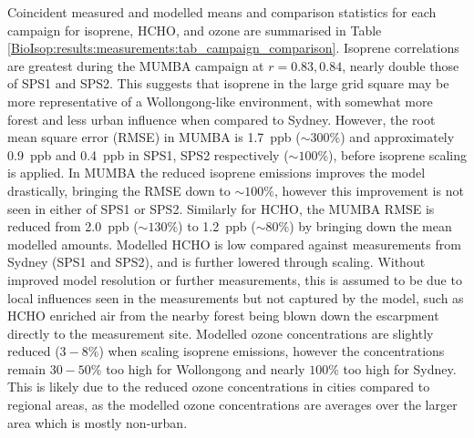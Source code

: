     Coincident measured and modelled means and comparison statistics for each campaign for isoprene, HCHO, and ozone are summarised in Table \ref{BioIsop:results:measurements:tab_campaign_comparison}.
    Isoprene correlations are greatest during the MUMBA campaign at $r=0.83,0.84$, nearly double those of SPS1 and SPS2.
    This suggests that isoprene in the large grid square may be more representative of a Wollongong-like environment, with somewhat more forest and less urban influence when compared to Sydney.
    However, the root mean square error (RMSE) in MUMBA is 1.7~ppb ($\sim 300\%$) and approximately 0.9~ppb and 0.4~ppb in SPS1, SPS2 respectively ($\sim 100\%$),  before isoprene scaling is applied.
    In MUMBA the reduced isoprene emissions improves the model drastically, bringing the RMSE down to $\sim{100}\%$, however this improvement is not seen in either of SPS1 or SPS2.
    Similarly for HCHO, the MUMBA RMSE is reduced from 2.0~ppb ($\sim{130}\%$) to 1.2~ppb ($\sim{80}\%$) by bringing down the mean modelled amounts.
    Modelled HCHO is low compared against measurements from Sydney (SPS1 and SPS2), and is further lowered through scaling.
    Without improved model resolution or further measurements, this is assumed to be due to local influences seen in the measurements but not captured by the model, such as HCHO enriched air from the nearby forest being blown down the escarpment directly to the measurement site.
    Modelled ozone concentrations are slightly reduced ($3-8\%$) when scaling isoprene emissions, however the concentrations remain $30-50\%$ too high for Wollongong and nearly $100\%$ too high for Sydney.
    This is likely due to the reduced ozone concentrations in cities compared to regional areas, as the modelled ozone concentrations are averages over the larger area which is mostly non-urban.
    
